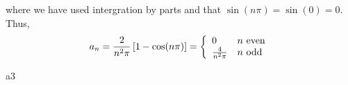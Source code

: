\begin{questions}
\begin{solution}
where we have used intergration by parts and that $\sin(n\pi)=\sin(0)=0$. Thus,
\begin{align*}
a_n=\frac{2}{n^2\pi}\left[1-\cos(n\pi)\right]= \left\{
\begin{array}{ll}
      0 & n $ even$ \\
      \frac{4}{n^2\pi} & n $ odd$ \\
\end{array} 
\right.
\end{align*}
\end{solution}
\begin{solution}
a3
\end{solution}
\end{questions}

